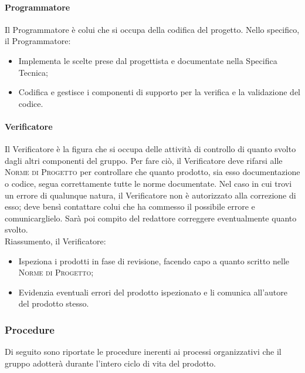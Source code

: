 \documentclass[../norme-di-progetto.tex]{subfiles}
\begin{document}
\paragraph{Programmatore}
Il Programmatore è colui che si occupa della codifica del progetto. Nello specifico, il Programmatore:
\begin{itemize}
  \item Implementa le scelte prese dal progettista e documentate nella Specifica Tecnica;
  \item Codifica e gestisce i componenti di supporto per la verifica e la validazione del codice.
\end{itemize}

\paragraph{Verificatore}
Il Verificatore è la figura che si occupa delle attività di controllo di quanto svolto dagli altri componenti del gruppo. Per fare ciò, il Verificatore deve rifarsi alle \textsc{Norme di Progetto} per controllare che quanto prodotto, sia esso documentazione o codice, segua correttamente tutte le norme documentate. Nel caso in cui trovi un errore di qualunque natura, il Verificatore non è autorizzato alla correzione di esso; deve bensì contattare colui che ha commesso il possibile errore e comunicarglielo. Sarà poi compito del redattore correggere eventualmente quanto svolto. \\
Riassumento, il Verificatore:
\begin{itemize}
  \item Ispeziona i prodotti in fase di revisione, facendo capo a quanto scritto nelle \textsc{Norme di Progetto};
  \item Evidenzia eventuali errori del prodotto ispezionato e li comunica all'autore del prodotto stesso.
\end{itemize}

\subsubsection{Procedure}
Di seguito sono riportate le procedure inerenti ai processi organizzativi che il gruppo adotterà durante l'intero ciclo di vita del prodotto.
\end{document}
